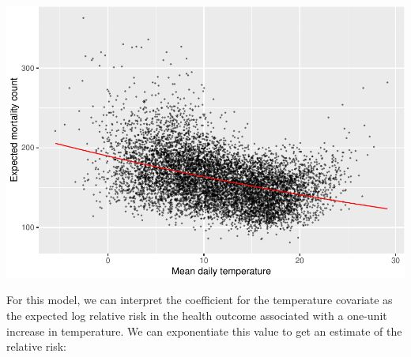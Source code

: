 \documentclass[
]{book}
\newenvironment{Shaded}{\begin{snugshade}}{\end{snugshade}}
\newcommand{\DataTypeTok}[1]{\textcolor[rgb]{0.13,0.29,0.53}{#1}}
\newcommand{\FloatTok}[1]{\textcolor[rgb]{0.00,0.00,0.81}{#1}}
\newcommand{\KeywordTok}[1]{\textcolor[rgb]{0.13,0.29,0.53}{\textbf{#1}}}
\newcommand{\NormalTok}[1]{#1}
\newcommand{\OperatorTok}[1]{\textcolor[rgb]{0.81,0.36,0.00}{\textbf{#1}}}
\newcommand{\StringTok}[1]{\textcolor[rgb]{0.31,0.60,0.02}{#1}}
\begin{document}
\begin{Shaded}
\end{Shaded}

\includegraphics{adv_epi_analysis_files/figure-latex/unnamed-chunk-33-1.pdf}

For this model, we can interpret the coefficient for the temperature covariate
as the expected log relative risk in the health outcome associated with a
one-unit increase in temperature. We can exponentiate this value to get an
estimate of the relative risk:
\end{document}
